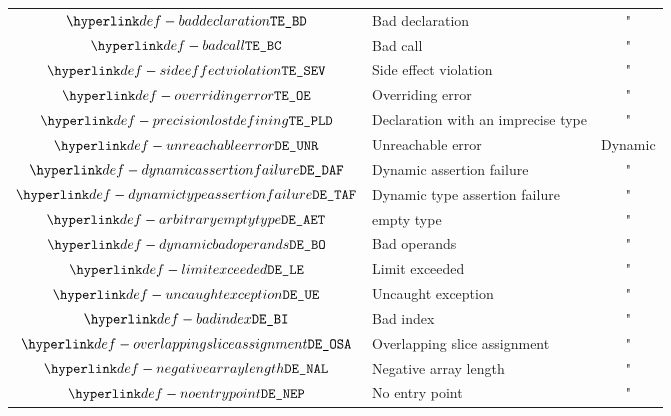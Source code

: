 \begin{center}
\begin{tabular}{clc}
  $\BadDeclaration$              & Bad declaration                & "             \\
  $\BadCall$                     & Bad call                       & "             \\
  $\SideEffectViolation$         & Side effect violation          & "             \\
  $\OverridingError$             & Overriding error               & "             \\
  $\PrecisionLostDefining$       & Declaration with an imprecise type & "         \\
  \hline
  $\UnreachableError$            & Unreachable error              & Dynamic       \\
  $\DynamicAssertionFailure$     & Dynamic assertion failure      & "             \\
  $\DynamicTypeAssertionFailure$ & Dynamic type assertion failure & "             \\
  $\ArbitraryEmptyType$          & \ARBITRARY{} empty type        & "             \\
  $\DynamicBadOperands$          & Bad operands                   & "             \\
  $\LimitExceeded$               & Limit exceeded                 & "             \\
  $\UncaughtException$           & Uncaught exception             & "             \\
  $\BadIndex$                    & Bad index                      & "             \\
  $\OverlappingSliceAssignment$  & Overlapping slice assignment   & "             \\
  $\NegativeArrayLength$         & Negative array length          & "             \\
  $\NoEntryPoint$                & No entry point                 & "             \\
\end{tabular}
\end{center}

